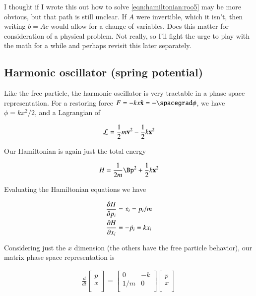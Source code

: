 I thought if I wrote this out how to solve \ref{eqn:hamiltonian:roo5} may be more obvious, but that path is still unclear.  If $A$ were invertible, which it isn't, then writing $b = A c$ would allow for a change of variables.  Does this matter for consideration of a physical problem.  Not really, so I'll fight the urge to play with the math for a while and perhaps revisit this later separately.

\subsection{Harmonic oscillator (spring potential)}

Like the free particle, the harmonic oscillator is very tractable in a phase space representation.  For a restoring force $F = - k x \xcap = -\spacegrad \phi$, we have $\phi = k x^2/2$, and a Lagrangian of

\begin{align}\label{eqn:hamiltonian:woo1}
\LL = \inv{2} m \Bv^2 - \inv{2} k \Bx^2
\end{align}

Our Hamiltonian is again just the total energy 

\begin{align}\label{eqn:hamiltonian:woo2}
H = \inv{2m} \Bp^2 + \inv{2} k \Bx^2
\end{align}

Evaluating the Hamiltonian equations we have

\begin{align}\label{eqn:hamiltonian:woo3}
\PD{p_i}{H} &= \dot{x_i} = p_i/m \\
\PD{x_i}{H} &= -\dot{p_i} = k x_i
\end{align}

Considering just the $x$ dimension (the others have the free particle behavior), our matrix phase space representation is

\begin{align}\label{eqn:hamiltonian:woo4}
\frac{d}{dt}
\begin{bmatrix}
p \\
x \\
\end{bmatrix}
=
\begin{bmatrix}
0 & - k \\
1/m & 0 \\
\end{bmatrix}
\begin{bmatrix}
p \\
x \\
\end{bmatrix}
\end{align}

